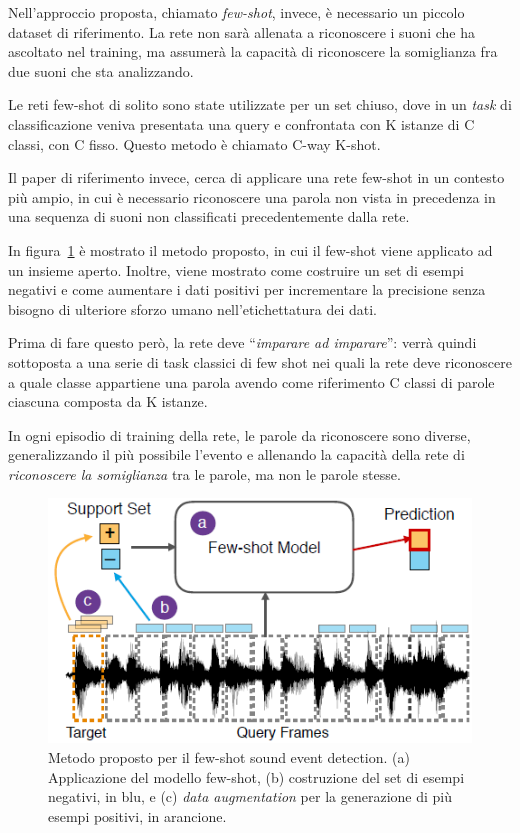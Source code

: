 \documentclass[12pt,a4paper,titlepage]{article}
\begin{document}
Nell'approccio proposta, chiamato \textit{few-shot}, invece, è necessario un piccolo dataset di riferimento. La rete non sarà allenata a riconoscere i suoni che ha ascoltato nel training, ma assumerà la capacità di riconoscere la somiglianza fra due suoni che sta analizzando.

Le reti few-shot di solito sono state utilizzate per un set chiuso, dove in un \textit{task} di classificazione veniva presentata una query e confrontata con K istanze di C classi, con C fisso.
Questo metodo è chiamato C-way K-shot.

Il paper di riferimento invece, cerca di applicare una rete few-shot in un contesto più ampio, in cui è necessario riconoscere una parola non vista in precedenza in una sequenza di suoni non classificati precedentemente dalla rete.

In figura~\ref{fig:few_shot_sound_event_detection_method} è mostrato il metodo proposto, in cui il few-shot viene applicato ad un insieme aperto. Inoltre, viene mostrato come costruire un set di esempi negativi e come aumentare i dati positivi per incrementare la precisione senza bisogno di ulteriore sforzo umano nell'etichettatura dei dati.

Prima di fare questo però, la rete deve ``\textit{imparare ad imparare}'': verrà quindi sottoposta a una serie di task classici di few shot nei quali la rete deve riconoscere a quale classe appartiene una parola avendo come riferimento C classi di parole ciascuna composta da K istanze.

In ogni episodio di training della rete, le parole da riconoscere sono diverse, generalizzando il più possibile l'evento e allenando la capacità della rete di \textit{riconoscere la somiglianza} tra le parole, ma non le parole stesse.

\begin{figure}[h]
	\centering	
	\includegraphics[width=.7\textwidth]{Immagini/few_shot_sound_event_detection_method}
	\caption{Metodo proposto per il few-shot sound event detection. (a) Applicazione del modello few-shot, (b) costruzione del set di esempi negativi, in blu, e (c) \textit{data augmentation} per la generazione di più esempi positivi, in arancione.~\cite{salamon:Few-Shot}}
	\label{fig:few_shot_sound_event_detection_method}
\end{figure}
\end{document}
